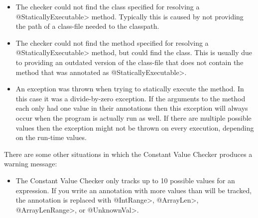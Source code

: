 \begin{sloppypar}
\begin{itemize}
\item {}

  The checker could not find the class
  specified for resolving a \<@StaticallyExecutable> method. Typically
  this is caused by not providing the path of a class-file needed to
  the classpath.

\item {}

  The checker could not find the method  specified for
  resolving a \<@StaticallyExecutable> method, but could find the
  class. This is usually due to providing an outdated version of the
  class-file that does not contain the
  method that was annotated as \<@StaticallyExecutable>.

\item {}

  An exception was thrown when trying to statically execute the
  method. In this case it was a divide-by-zero exception. If the
  arguments to the method each only had one value in their annotations
  then this exception will always occur when the program is actually
  run as well. If there are multiple possible values then the exception
  might not be thrown on every execution, depending on the run-time values.

\end{itemize}
\end{sloppypar}

There are some other situations in which the Constant Value Checker produces a
warning message:

\begin{sloppypar}
\begin{itemize}
\item {}

  The Constant Value Checker only tracks up to 10 possible values for an
  expression.  If you write an annotation with more values than will be
  tracked, the annotation is replaced with \<@IntRange>, \<@ArrayLen>, \<@ArrayLenRange>, or \<@UnknownVal>.

\end{itemize}
\end{sloppypar}



